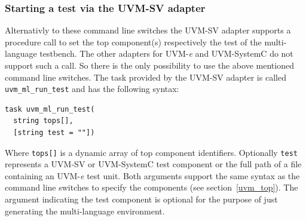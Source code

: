 \subsubsection{Starting a test via the UVM-SV adapter}

Alternativly to these command line switches the UVM-SV adapter supports a procedure call to set the top
component(s) respectively the test of the multi-language testbench. The other adapters for UVM-\textit{e} and
UVM-SystemC do not support such a call. So there is the only possibility to use the above mentioned command line
switches. The task provided by the UVM-SV adapter is called \lstinline$uvm_ml_run_test$ and has the following
syntax:
\medskip
{}
\begin{lstlisting}
task uvm_ml_run_test(
  string tops[],
  [string test = ""])
\end{lstlisting} 
\medskip
Where \lstinline$tops[]$ is a dynamic array of top component identifiers. Optionally \lstinline$test$ represents a
UVM-SV or UVM-SystemC test component or the full path of a file containing an UVM-\textit{e} test unit. Both arguments
support the same syntax as the command line switches to specify the components (see section~\ref{uvm_top}). The argument
indicating the test component is optional for the purpose of just generating the multi-language environment.